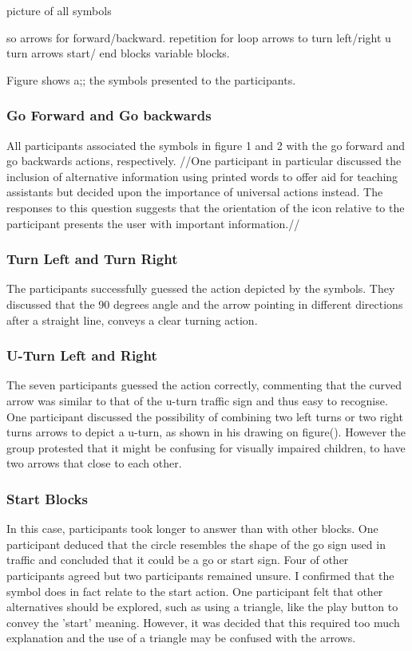 \documentclass[oneside,%
                    author={Malak Hajji},
                    degree={BSc},
                    title={Designing An Accessible Computational Toolkit For Students},
                  subtitle={With Mixed Visual Abilities}]{dissertation}
\begin{document}
picture of all symbols 

so arrows for forward/backward.
repetition for loop
arrows to turn left/right
u turn arrows
start/ end blocks
variable blocks.

Figure shows a;; the symbols presented to the participants. 

\subsubsection{Go Forward and Go backwards}
All participants associated the symbols in figure 1 and 2 with the go forward and go backwards actions, respectively. //One participant in particular discussed the inclusion of alternative information using printed words to offer aid for teaching assistants but decided upon the importance of universal actions instead. The responses to this question suggests that the orientation of the icon relative to the participant presents the user with important information.//

\subsubsection{Turn Left and Turn Right}
The participants successfully guessed the action depicted by the symbols. They discussed that the 90 degrees angle and the arrow pointing in different directions after a straight line, conveys a clear turning action. 

\subsubsection{U-Turn Left and Right}
The seven participants guessed the action correctly, commenting that the curved arrow was similar to that of the u-turn traffic sign and thus easy to recognise. One participant discussed the possibility of combining two left turns or two right turns arrows to depict a u-turn, as shown in his drawing on figure(). However the group protested that it might be confusing for visually impaired children, to have two arrows that close to each other.

\subsubsection{Start Blocks}
In this case, participants took longer to answer than with other blocks. One participant deduced that the circle resembles the shape of the go sign used in traffic and concluded that it could be a go or start sign. Four of other participants agreed but two participants remained unsure.  I confirmed that the symbol does in fact relate to the start action. One participant felt that other alternatives should be explored, such as using a triangle, like the play button to convey the 'start' meaning. However, it was decided that this required too much explanation and the use of a triangle may be confused with the arrows.
\end{document}
